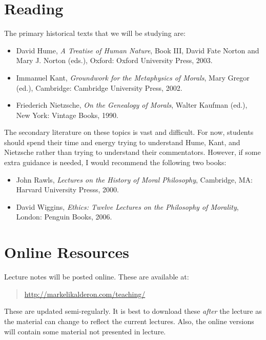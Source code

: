 \documentclass[12pt]{article}
\begin{document}

\section{Reading}\label{sec:reading} %

The primary historical texts that we will be studying are:
\begin{itemize}
    \item David Hume, \emph{A Treatise of Human Nature}, Book III, David Fate Norton and Mary J. Norton (eds.), Oxford: Oxford University Press, 2003.
    \item Immanuel Kant, \emph{Groundwork for the Metaphysics of Morals}, Mary Gregor (ed.), Cambridge: Cambridge University Press, 2002.
    \item Friederich Nietzsche, \emph{On the Genealogy of Morals}, Walter Kaufman (ed.), New York: Vintage Books, 1990.
\end{itemize}

The secondary literature on these topics is vast and difficult. For now, students should spend their time and energy trying to understand Hume, Kant, and Nietzsche rather than trying to understand their commentators. However, if some extra guidance is needed, I would recommend the following two books:
\begin{itemize}
    \item John Rawls, \emph{Lectures on the History of Moral Philosophy}, Cambridge, MA: Harvard University Presss, 2000.
    \item David Wiggins, \emph{Ethics: Twelve Lectures on the Philosophy of Morality}, London: Penguin Books, 2006.
\end{itemize}


\section{Online Resources}\label{sec:online_resources} %

Lecture notes will be posted online. These are available at:
\begin{quote}
	\url{http://markelikalderon.com/teaching/}
\end{quote}
These are updated semi-regularly. It is best to download these \emph{after} the lecture as the material can change to reflect the current lectures. Also, the online versions will contain some material not presented in lecture.
\end{document}
